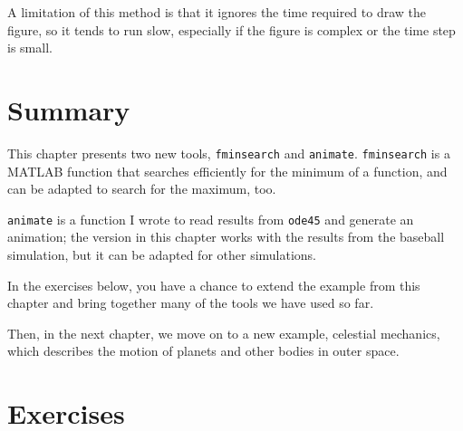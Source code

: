 A limitation of this method is that it ignores the time required to
draw the figure, so it tends to run slow, especially if the figure is
complex or the time step is small.

\section{Summary}

This chapter presents two new tools, {\tt fminsearch} and {\tt animate}.  {\tt fminsearch} is a MATLAB function that searches efficiently for the minimum of a function, and can be adapted to search for the maximum, too.

{\tt animate} is a function I wrote to read results from {\tt ode45} and generate an animation; the version in this chapter works with the results from the baseball simulation, but it can be adapted for other simulations.

In the exercises below, you have a chance to extend the example from this chapter and bring together many of the tools we have used so far.

Then, in the next chapter, we move on to a new example, celestial mechanics, which describes the motion of planets and other bodies in outer space.


\section{Exercises}

